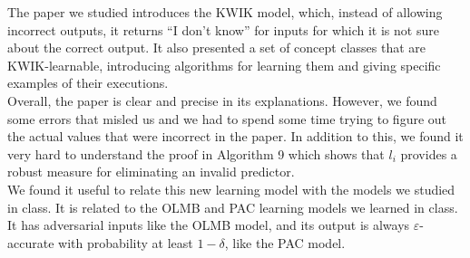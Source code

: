 The paper we studied introduces the KWIK model, which, instead of allowing
incorrect outputs, it returns ``I don't know'' for inputs for which it is not
sure about the correct output. It also presented a set of concept classes that
are KWIK-learnable, introducing algorithms for learning them and giving
specific examples of their executions. \\

Overall, the paper is clear and precise in its explanations. However, we found
some errors that misled us and we had to spend some time trying to figure out
the actual values that were incorrect in the paper. In addition to this, we
found it very hard to understand the proof in Algorithm 9 which shows that $l_i$
provides a robust measure for eliminating an invalid predictor. \\

We found it useful to relate this new learning model with the models we studied in class.
It is related to the OLMB and PAC learning models we learned in class. It has
adversarial inputs like the OLMB model, and its output is always
$\varepsilon$-accurate with probability at least $1 - \delta$, like the PAC
model. \\
